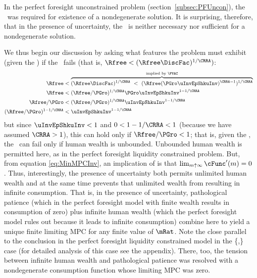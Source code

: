 \documentclass[BufferStockTheory]{subfiles}
\begin{document}
In the perfect foresight unconstrained problem
(section~\ref{subsec:PFUncon}), the \RIC~was required for existence of
a nondegenerate solution.  It is surprising, therefore, that in the
presence of uncertainty, the \RIC~is neither necessary nor sufficient
for a nondegenerate solution.
\begin{comment}
  But if the \RIC~does hold, some useful results can be derived.  Arguably
  the most fundamental are that the limiting values
  for the minimal and maximal marginal propensities to consume implicit in
  \eqref{eq:MaxMPCInv} and \eqref{eq:MinMPCInv} are positive and finite.
\end{comment}
We thus begin our discussion by asking what features the problem must
exhibit (given the \FVAC) if the \RIC~fails (that is, $\Rfree < (\Rfree \DiscFac)^{1/\CRRA})$:
\begin{align}
  \Rfree   & < \overbrace{(\Rfree \DiscFac)^{1/\CRRA} ~ < ~ (\Rfree (\PGro \uInvEpShkuInv)^{\CRRA-1})^{1/\CRRA}}^{\text{implied by \FVAC}} \notag
  \\  \Rfree   & < (\Rfree/\PGro)^{1/\CRRA}\PGro \uInvEpShkuInv^{1-1/\CRRA} \notag
  \\  \Rfree/\PGro  & < (\Rfree/\PGro)^{1/\CRRA}\uInvEpShkuInv^{1-1/\CRRA} \notag
  \\  (\Rfree/\PGro)^{1-1/\CRRA}  & < \uInvEpShkuInv^{1-1/\CRRA} \label{eq:RICimplies}
\end{align}
but since $\uInvEpShkuInv<1$ and $0 < 1-1/\CRRA < 1$ (because we have
assumed $\CRRA > 1$), this can hold only if $\Rfree/\PGro < 1$; that
is, given the \FVAC, the \RIC~can fail only if human wealth is
unbounded.  Unbounded human wealth is permitted here, as in the
perfect foresight liquidity constrained problem.  But,
from  equation
\eqref{eq:MinMPCInv}, an implication of \cncl{\RIC} is that $\lim_{m
  \uparrow \infty} \cFunc^{\prime}(m) = 0$.  Thus, interestingly,
the presence of uncertainty both permits unlimited human wealth and at
the same time prevents that unlimited wealth from resulting in
infinite consumption.  That is, in the presence of uncertainty,
pathological patience (which in the perfect foresight model with
finite wealth results in consumption of zero) plus infinite human
wealth (which the perfect foresight model rules out because it leads
to infinite consumption) combine here to yield a unique finite
limiting MPC for any finite value of $\mRat$.  Note
the close parallel to the conclusion in the perfect foresight
liquidity constrained model in the
\{\PFGIC,\cncl{\RIC}\} case (for detailed analysis of this
case see the appendix).  There, too, the tension between infinite human wealth
and pathological patience was resolved with a nondegenerate consumption function
whose limiting MPC was zero.
\end{document}
